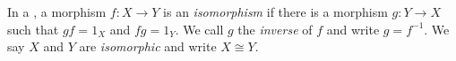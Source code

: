 


\begin{dfn*}[Isomorphism]
	In a , a morphism $f: X\rightarrow Y$ is an \emph{isomorphism} if
	there is a morphism $g: Y\rightarrow X$ such that $gf = 1_X$ and $fg = 1_Y$.
	We call $g$ the \emph{inverse} of $f$ and write $g = f^{-1}$. We say $X$ and
	$Y$ are \emph{isomorphic} and write $X\cong Y$.
\end{dfn*}


